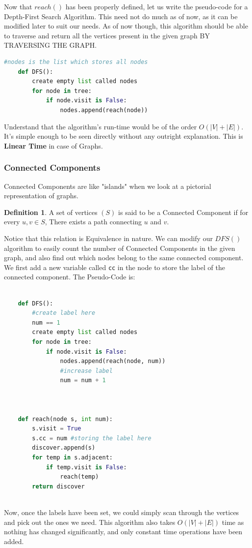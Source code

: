 \documentclass{article}
\theoremstyle{definition}
\newtheorem*{definition}{Definition}
\theoremstyle{example}
\begin{document}
\vspace{4mm}
Now that $reach()$ has been properly defined, let us write the pseudo-code for a Depth-First Search Algorithm. This need not do much as of now, as it can be modified later to suit our needs. As of now though, this algorithm should be able to traverse and return all the vertices present in the given graph BY TRAVERSING THE GRAPH.
\newpage
\begin{lstlisting}[language = python, basicstyle = \Large]
    #nodes is the list which stores all nodes
    def DFS():
        create empty list called nodes
        for node in tree:
            if node.visit is False:
                nodes.append(reach(node))
\end{lstlisting}
\vspace{4mm}
Understand that the algorithm's run-time would be of the order $O(|V|+|E|)$. It's simple enough to be seen directly without any outright explanation. This is \textbf{Linear Time} in case of Graphs.

\subsubsection{\Large Connected Components}
\hspace{4mm} Connected Components are like "islands" when we look at a pictorial representation of graphs.
\theoremstyle{definition}
\begin{definition}
    A set of vertices $(S)$ is said to be a Connected Component if for every $u, v \in S$, There exists a path connecting $u$ and $v$.
\end{definition}

Notice that this relation is Equivalence in nature. We can modify our $DFS()$ algorithm to easily count the number of Connected Components in the given graph, and also find out which nodes belong to the same connected component. We first add a new variable called \texttt{cc} in the node to store the label of the connected component. The Pseudo-Code is:
\vspace{3mm}
\begin{lstlisting}[language = python, basicstyle = \Large]
    
    def DFS():
        #create label here
        num == 1
        create empty list called nodes
        for node in tree:
            if node.visit is False:
                nodes.append(reach(node, num))
                #increase label
                num = num + 1 
    
    
    
    def reach(node s, int num):
        s.visit = True
        s.cc = num #storing the label here
        discover.append(s)
        for temp in s.adjacent:
            if temp.visit is False:
                reach(temp)
        return discover
 
\end{lstlisting}
\vspace{4mm}
\hspace{4mm} Now, once the labels have been set, we could simply scan through the vertices and pick out the ones we need. This algorithm also takes $O(|V|+|E|)$ time as nothing has changed significantly, and only constant time operations have been added.
\end{document}
